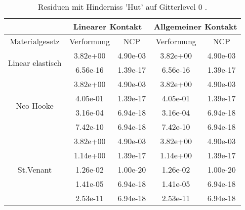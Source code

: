 \begin{table} 
\centering 
\begin{tabular}{c|cc|cc|} 
\cline{2-5} 
 & \multicolumn{2}{|c|}{Linearer Kontakt} & \multicolumn{2}{|c|}{Allgemeiner Kontakt} \\ 
\hline 
\multicolumn{1}{|c|}{Materialgesetz} & \multicolumn{1}{c|}{Verformung} & \multicolumn{1}{c|}{NCP} & \multicolumn{1}{c|}{Verformung} & \multicolumn{1}{c|}{NCP} \\ 
\hline 
\multicolumn{1}{|c|}{\multirow{2}{*}{Linear elastisch}} &\multicolumn{1}{|c|}{  3.82e+00} & \multicolumn{1}{|c|}{  4.90e-03} & \multicolumn{1}{|c|}{  3.82e+00} & \multicolumn{1}{|c|}{  4.90e-03} \\ 
\multicolumn{1}{|c|}{} & \multicolumn{1}{|c|}{  6.56e-16} & \multicolumn{1}{|c|}{  1.39e-17} & \multicolumn{1}{|c|}{  6.56e-16} & \multicolumn{1}{|c|}{  1.39e-17} \\ 
\hline 
\multicolumn{1}{|c|}{\multirow{4}{*}{Neo Hooke}} &\multicolumn{1}{|c|}{  3.82e+00} & \multicolumn{1}{|c|}{  4.90e-03} & \multicolumn{1}{|c|}{  3.82e+00} & \multicolumn{1}{|c|}{  4.90e-03} \\ 
\multicolumn{1}{|c|}{} & \multicolumn{1}{|c|}{  4.05e-01} & \multicolumn{1}{|c|}{  1.39e-17} & \multicolumn{1}{|c|}{  4.05e-01} & \multicolumn{1}{|c|}{  1.39e-17} \\ 
\multicolumn{1}{|c|}{} & \multicolumn{1}{|c|}{  3.16e-04} & \multicolumn{1}{|c|}{  6.94e-18} & \multicolumn{1}{|c|}{  3.16e-04} & \multicolumn{1}{|c|}{  6.94e-18} \\ 
\multicolumn{1}{|c|}{} & \multicolumn{1}{|c|}{  7.42e-10} & \multicolumn{1}{|c|}{  6.94e-18} & \multicolumn{1}{|c|}{  7.42e-10} & \multicolumn{1}{|c|}{  6.94e-18} \\ 
\hline 
\multicolumn{1}{|c|}{\multirow{5}{*}{St.Venant}} &\multicolumn{1}{|c|}{  3.82e+00} & \multicolumn{1}{|c|}{  4.90e-03} & \multicolumn{1}{|c|}{  3.82e+00} & \multicolumn{1}{|c|}{  4.90e-03} \\ 
\multicolumn{1}{|c|}{} & \multicolumn{1}{|c|}{  1.14e+00} & \multicolumn{1}{|c|}{  1.39e-17} & \multicolumn{1}{|c|}{  1.14e+00} & \multicolumn{1}{|c|}{  1.39e-17} \\ 
\multicolumn{1}{|c|}{} & \multicolumn{1}{|c|}{  1.26e-02} & \multicolumn{1}{|c|}{  1.00e-20} & \multicolumn{1}{|c|}{  1.26e-02} & \multicolumn{1}{|c|}{  1.00e-20} \\ 
\multicolumn{1}{|c|}{} & \multicolumn{1}{|c|}{  1.41e-05} & \multicolumn{1}{|c|}{  6.94e-18} & \multicolumn{1}{|c|}{  1.41e-05} & \multicolumn{1}{|c|}{  6.94e-18} \\ 
\multicolumn{1}{|c|}{} & \multicolumn{1}{|c|}{  2.53e-11} & \multicolumn{1}{|c|}{  6.94e-18} & \multicolumn{1}{|c|}{  2.53e-11} & \multicolumn{1}{|c|}{  6.94e-18} \\ 
\hline 
\end{tabular}\caption{Residuen mit Hinderniss 'Hut' auf Gitterlevel 0 .}\label{tab:Residuum_Hut_level0}
\end{table} 
